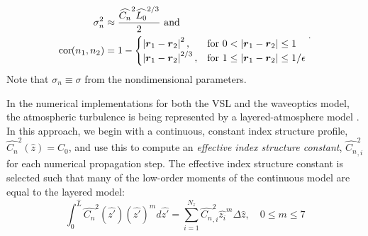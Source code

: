 \documentclass[9pt,twocolumn,twoside]{osajnl}
\def\bm#1{\mbox{\boldmath{$#1$}}}
\def\cor#1{\mathrm{cor}\hspace{-0.03in}\left(#1 \right)}
\let\truesum=\sum
\def\sum{\mathop{\textstyle\truesum}\limits}
\def\vect#1{\bm{#1}}
\newcommand{\la}[1]{\label{#1}}
\begin{document}
\begin{equation*} %
	\begin{aligned}
		\sigma_n^2 & \approx \frac{\widehat{C_n}^2 \widehat{L_0}^{2/3}}{2} \text{ and} \\
		\cor{n_1,n_2} & = 1 - 
		\begin{cases}
			\left|\vect{r}_1-\vect{r}_{2}\right|^{2}, & \text{for } 0 < \left|\vect{r}_1-\vect{r}_{2}\right| \leq 1 \\
			\left|\vect{r}_1-\vect{r}_{2}\right|^{2/3}, & \text{for } 1 \leq \left| \vect{r}_1 - \vect{r}_{2} \right| \leq  1/\epsilon
		\end{cases}
	\end{aligned} \, .
\end{equation*}
Note that $\sigma_n \equiv \sigma$ from the nondimensional parameters. 

In the numerical implementations for both the VSL and the waveoptics model, the atmospheric turbulence 
is being represented by a layered-atmosphere model \cite{effectiveCns, NumSimOpticalWaveProp}. 
In this approach, we begin with a continuous, constant index structure profile, $\widehat{C_n}^2(\widehat{z})= C_0$, 
and use this to compute an \emph{effective index structure constant}, $\widehat{C_{n}}_{,i}^2$ for each 
numerical propagation step. 
The effective index structure constant is selected such that many of the low-order moments of the continuous 
model are equal to the layered model:
\begin{equation}
    \la{equ:effectiveCn}
    \int_0^{\widehat{L}}\widehat{C_n}^2(\widehat{z'})(\widehat{z'})^m d\widehat{z'} = \sum_{i=1}^{N_{z}} \widehat{C_{n}}_{,i}^2 \widehat{z_{i}}^{m}\Delta \widehat{z}, \quad 0\leq m \leq 7
\end{equation}
\end{document}
